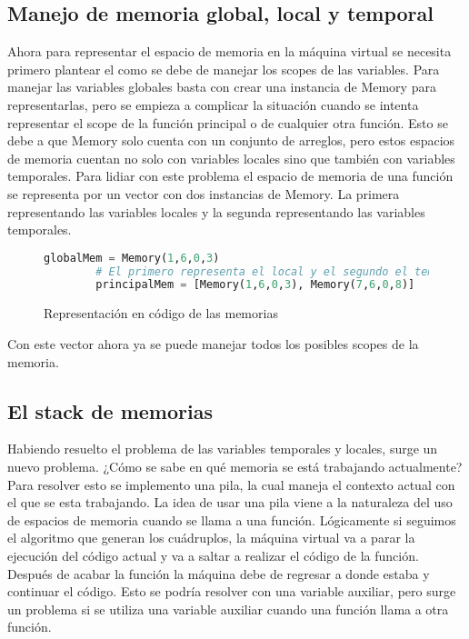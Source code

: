 \subsection{Manejo de memoria global, local y temporal}

Ahora para representar el espacio de memoria en la máquina virtual se necesita primero plantear el como se debe de manejar los scopes de las variables. Para manejar las variables globales basta con crear una instancia de Memory para representarlas, pero se empieza a complicar la situación cuando se intenta representar el scope de la función principal o de cualquier otra función. Esto se debe a que Memory solo cuenta con un conjunto de arreglos, pero estos espacios de memoria cuentan no solo con variables locales sino que también con variables temporales. Para lidiar con este problema el espacio de memoria de una función se representa por un vector con dos instancias de Memory. La primera representando las variables locales y la segunda representando las variables temporales.

\begin{figure}
    \centering
    \begin{lstlisting}[language=Python]
        globalMem = Memory(1,6,0,3)
        # El primero representa el local y el segundo el temporal
        principalMem = [Memory(1,6,0,3), Memory(7,6,0,8)] 
    \end{lstlisting}
    \caption{Representación en código de las memorias}
    \label{fig:my_label}
\end{figure}
\FloatBarrier

Con este vector ahora ya se puede manejar todos los posibles scopes de la memoria.


\subsection{El stack de memorias}

Habiendo resuelto el problema de las variables temporales y locales, surge un nuevo problema. ¿Cómo se sabe en qué memoria se está trabajando actualmente? Para resolver esto se implemento una pila, la cual maneja el contexto actual con el que se esta trabajando. La idea de usar una pila viene a la naturaleza del uso de espacios de memoria cuando se llama a una función. 
Lógicamente si seguimos el algoritmo que generan los cuádruplos, la máquina virtual va a parar la ejecución del código actual y va a saltar a realizar el código de la función. Después de acabar la función la máquina debe de regresar a donde estaba y continuar el código. Esto se podría resolver con una variable auxiliar, pero surge un problema si se utiliza una variable auxiliar cuando una función llama a otra función. 

